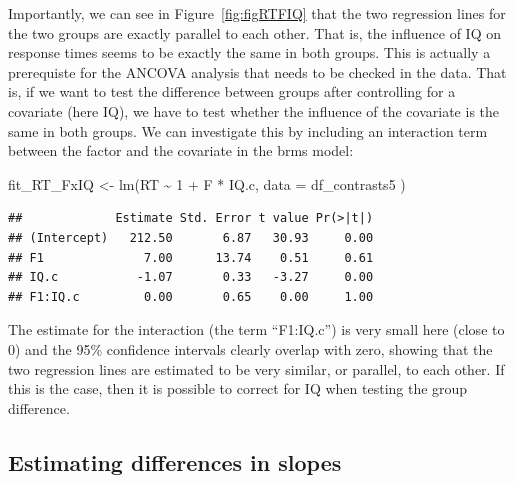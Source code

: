 \documentclass[
  12pt,
]{krantz}
\newenvironment{Shaded}{\begin{snugshade}}{\end{snugshade}}
\newcommand{\AttributeTok}[1]{\textcolor[rgb]{0.77,0.63,0.00}{#1}}
\newcommand{\DecValTok}[1]{\textcolor[rgb]{0.00,0.00,0.81}{#1}}
\newcommand{\FunctionTok}[1]{\textcolor[rgb]{0.00,0.00,0.00}{#1}}
\newcommand{\NormalTok}[1]{#1}
\newcommand{\OtherTok}[1]{\textcolor[rgb]{0.56,0.35,0.01}{#1}}
\newcommand{\SpecialCharTok}[1]{\textcolor[rgb]{0.00,0.00,0.00}{#1}}
\theoremstyle{definition}
\theoremstyle{definition}
\theoremstyle{definition}
\theoremstyle{definition}
\theoremstyle{remark}
\begin{document}
Importantly, we can see in Figure~\ref{fig:figRTFIQ} that the two regression lines for the two groups are exactly parallel to each other. That is, the influence of IQ on response times seems to be exactly the same in both groups. This is actually a prerequiste for the ANCOVA analysis that needs to be checked in the data. That is, if we want to test the difference between groups after controlling for a covariate (here IQ), we have to test whether the influence of the covariate is the same in both groups. We can investigate this by including an interaction term between the factor and the covariate in the brms model:

\begin{Shaded}
\begin{Highlighting}[]
\NormalTok{fit\_RT\_FxIQ }\OtherTok{\textless{}{-}} \FunctionTok{lm}\NormalTok{(RT }\SpecialCharTok{\textasciitilde{}} \DecValTok{1} \SpecialCharTok{+}\NormalTok{ F }\SpecialCharTok{*}\NormalTok{ IQ.c,}
  \AttributeTok{data =}\NormalTok{ df\_contrasts5}
\NormalTok{)}
\end{Highlighting}
\end{Shaded}

\begin{Shaded}
\end{Shaded}

\begin{verbatim}
##             Estimate Std. Error t value Pr(>|t|)
## (Intercept)   212.50       6.87   30.93     0.00
## F1              7.00      13.74    0.51     0.61
## IQ.c           -1.07       0.33   -3.27     0.00
## F1:IQ.c         0.00       0.65    0.00     1.00
\end{verbatim}

The estimate for the interaction (the term ``F1:IQ.c'') is very small here (close to 0) and the 95\% confidence intervals clearly overlap with zero, showing that the two regression lines are estimated to be very similar, or parallel, to each other. If this is the case, then it is possible to correct for IQ when testing the group difference.

\hypertarget{estimating-differences-in-slopes}{%
\subsection{Estimating differences in slopes}\label{estimating-differences-in-slopes}}
\end{document}
